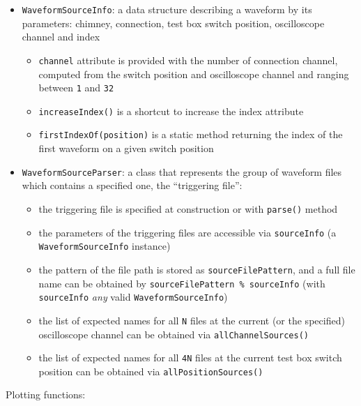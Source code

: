 \begin{itemize}
  \item \texttt{WaveformSourceInfo}: a data structure describing a waveform by
    its parameters: chimney, connection, test box switch position,
    oscilloscope channel and index
    \begin{itemize}
      \item
        \texttt{channel} attribute is provided with the number of connection
        channel, computed from the switch position and oscilloscope channel
        and ranging between \texttt{1} and \texttt{32}
      \item
        \texttt{increaseIndex()} is a shortcut to increase the index
        attribute
      \item
        \texttt{firstIndexOf(position)} is a static method returning the
        index of the first waveform on a given switch position
    \end{itemize}
    \item
      \texttt{WaveformSourceParser}: a class that represents the group of
      waveform files which contains a specified one, the ``triggering
      file'':
      \begin{itemize}
        \item
          the triggering file is specified at construction or with
          \texttt{parse()} method
        \item
          the parameters of the triggering files are accessible via
          \texttt{sourceInfo} (a \texttt{WaveformSourceInfo} instance)
        \item
          the pattern of the file path is stored as
          \texttt{sourceFilePattern}, and a full file name can be obtained by
          \texttt{sourceFilePattern\ \%\ sourceInfo} (with \texttt{sourceInfo}
          \emph{any} valid \texttt{WaveformSourceInfo})
        \item
          the list of expected names for all \texttt{N} files at the current
          (or the specified) oscilloscope channel can be obtained via
          \texttt{allChannelSources()}
        \item
          the list of expected names for all \texttt{4N} files at the current
          test box switch position can be obtained via
          \texttt{allPositionSources()}
      \end{itemize}
\end{itemize}
Plotting functions:
